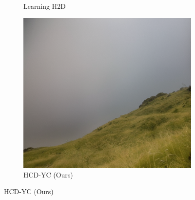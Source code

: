 \documentclass{article}
\begin{document}
\begin{figure}[t]
\begin{subfigure}[b]{0.32\textwidth}
    \caption{Learning H2D}
\end{subfigure}
\hfill
\begin{subfigure}[b]{0.32\textwidth}
    \centering
    \includegraphics[width=\textwidth]{examples_ours/1_isr_adaptive.png}
    \caption{HCD-YC (Ours)}
\end{subfigure}


\end{figure}
\end{document}
